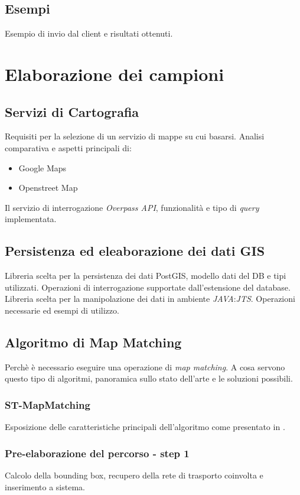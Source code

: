 \documentclass[a4paper, 12pt, twoside, openright]{book}
\begin{document}
\section{Esempi}
Esempio di invio dal client e risultati ottenuti.

\chapter{Elaborazione dei campioni} %
\section{Servizi di Cartografia}
Requisiti per la selezione di un servizio di mappe su cui basarsi. Analisi comparativa e aspetti principali di:
\begin{itemize}
\item Google Maps
\item Openstreet Map
\end{itemize}
Il servizio di interrogazione \emph{Overpass API}, funzionalità e tipo di \emph{query} implementata.

\section{Persistenza ed eleaborazione dei dati GIS}
Libreria scelta per la persistenza dei dati PostGIS, modello dati del DB e tipi utilizzati. Operazioni di interrogazione supportate dall'estensione del database.
Libreria scelta per la manipolazione dei dati in ambiente \emph{JAVA}:\emph{JTS}. Operazioni necessarie ed esempi di utilizzo. 

\section{Algoritmo di Map Matching}
Perchè è necessario eseguire una operazione di \emph{map matching}. A cosa servono questo tipo di algoritmi, panoramica sullo stato dell'arte e le soluzioni possibili.
\subsection{ST-MapMatching}
Esposizione delle caratteristiche principali dell'algoritmo come presentato in \cite{stmapmatching}.
\subsection{Pre-elaborazione del percorso - step 1}
Calcolo della bounding box, recupero della rete di trasporto coinvolta e inserimento a sistema.
\end{document}
